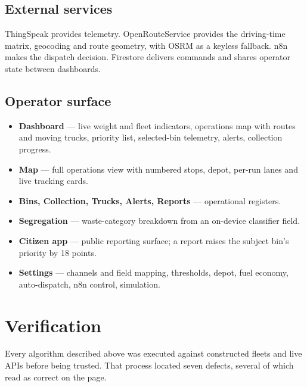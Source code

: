 \documentclass[11pt,a4paper]{article}
\begin{document}
\subsection{External services}

ThingSpeak provides telemetry. OpenRouteService provides the driving-time
matrix, geocoding and route geometry, with OSRM as a keyless fallback.
n8n makes the dispatch decision. Firestore delivers commands and shares
operator state between dashboards.

\subsection{Operator surface}

\begin{itemize}
  \item \textbf{Dashboard} --- live weight and fleet indicators, operations
        map with routes and moving trucks, priority list, selected-bin
        telemetry, alerts, collection progress.
  \item \textbf{Map} --- full operations view with numbered stops, depot,
        per-run lanes and live tracking cards.
  \item \textbf{Bins, Collection, Trucks, Alerts, Reports} --- operational registers.
  \item \textbf{Segregation} --- waste-category breakdown from an on-device
        classifier field.
  \item \textbf{Citizen app} --- public reporting surface; a report raises the
        subject bin's priority by 18 points.
  \item \textbf{Settings} --- channels and field mapping, thresholds, depot,
        fuel economy, auto-dispatch, n8n control, simulation.
\end{itemize}

\section{Verification}

Every algorithm described above was executed against constructed fleets
and live APIs before being trusted. That process located seven defects,
several of which read as correct on the page.
\end{document}
